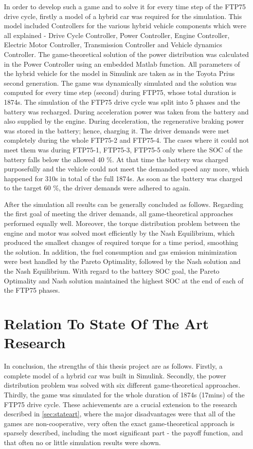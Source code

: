 In order to develop such a game and to solve it for every time step of the FTP75 drive cycle, firstly a model of a hybrid car was required for the simulation. This model included Controllers for the various hybrid vehicle components which were all explained - Drive Cycle Controller, Power Controller, Engine Controller, Electric Motor Controller, Transmission Controller and Vehicle dynamics Controller. The game-theoretical solution of the power distribution was calculated in the Power Controller using an embedded Matlab function. All parameters of the hybrid vehicle for the model in Simulink are taken as in the Toyota Prius second generation. The game was dynamically simulated and the solution was computed for every time step (second) during FTP75, whose total duration is 1874s. The simulation of the FTP75 drive cycle was split into 5 phases and the battery was recharged. During acceleration power was taken from the battery and also supplied by the engine. During deceleration, the regenerative braking power was stored in the battery; hence, charging it. The driver demands were met completely during the whole FTP75-2 and FTP75-4. The cases where it could not meet them was during FTP75-1, FTP75-3, FTP75-5 only where the SOC of the battery falls below the allowed 40 \%. At that time the battery was charged purposefully and the vehicle could not meet the demanded speed any more, which happened for 310s in total of the full 1874s. As soon as the battery was charged to the target 60 \%, the driver demands were adhered to again.

After the simulation all results can be generally concluded as follows. Regarding the first goal of meeting the driver demands, all game-theoretical approaches performed equally well. Moreover, the torque distribution problem between the engine and motor was solved most efficiently by the Nash Equilibrium, which produced the smallest changes of required torque for a time period, smoothing the solution. In addition, the fuel consumption and gas emission minimization were best handled by the Pareto Optimality, followed by the Nash solution and the Nash Equilibrium. With regard to the battery SOC goal, the Pareto Optimality and Nash solution maintained the highest SOC at the end of each of the FTP75 phases.

\section{Relation To State Of The Art Research}
In conclusion, the strengths of this thesis project are as follows. Firstly, a complete model of a hybrid car was built in Simulink. Secondly, the power distribution problem was solved with six different game-theoretical approaches. Thirdly, the game was simulated for the whole duration of 1874s (17mins) of the FTP75 drive cycle. These achievements are a crucial extension to the research described in \ref{sec:stateart}, where the major disadvantages were that all of the games are non-cooperative, very often the exact game-theoretical approach is sparsely described, including the most significant part - the payoff function, and that often no or little simulation results were shown.


